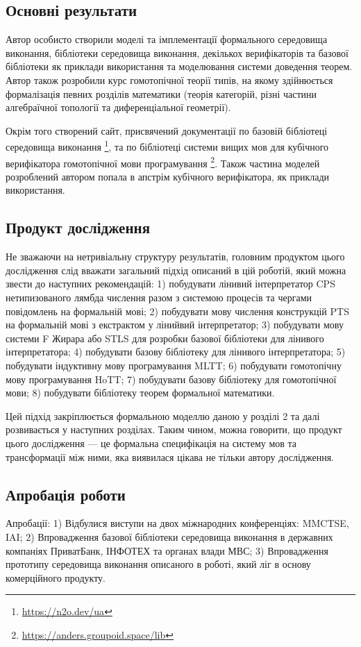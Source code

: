 \subsection{Основні результати}
Автор особисто створили моделі та імплементації формального середовища виконання,
бібліотеки середовища виконання, декількох верифікаторів та базової бібліотеки
як приклади використання та моделювання системи доведення теорем. Автор також
розробили курс гомотопічної теорії типів, на якому здійнюється формалізація
певних розділів математики (теорія категорій, різні частини алгебраїчної
топології та диференціальної геометрії).

Окрім того створений сайт, присвячений документації по базовій бібліотеці
середовища виконання \footnote{\url{https://n2o.dev/ua}},
та по бібліотеці системи вищих мов для кубічного верифікатора гомотопічної
мови програмування \footnote{\url{https://anders.groupoid.space/lib}}. Також частина
моделей розроблений автором попала в апстрім кубічного верифікатора,
як приклади використання.

\subsection{Продукт дослідження}
Не зважаючи на нетривіальну структуру результатів, головним продуктом цього
дослідження слід вважати загальний підхід описаний в цій роботій, який можна
звести до наступних рекомендацій:
1) побудувати лінивий інтерпретатор CPS нетипизованого лямбда числення разом
   з системою процесів та чергами повідомлень на формальній мові;
2) побудувати мову числення конструкцій PTS на формальній мові з екстрактом у лінийвий інтерпретатор;
3) побудувати мову системи F Жирара або STLS для розробки базової бібліотеки для лінивого інтерпретатора;
4) побудувати базову бібліотеку для лінивого інтерпретатора;
5) побудувати індуктивну мову програмування MLTT;
6) побудувати гомотопічну мову програмування HoTT;
7) побудувати базову бібліотеку для гомотопічної мови;
8) побудувати бібліотеку теорем формальної математики.

Цей підхід закріплюється формальною моделлю даною у розділі 2 та далі розвивається у наступних розділах.
Таким чином, можна говорити, що продукт цього дослідження --- це формальна специфікація на систему мов та
трансформації між ними, яка виявилася цікава не тільки автору дослідження.

\subsection{Апробація роботи}
Апробації:
1) Відбулися виступи на двох міжнародних конференціях: MMCTSE, IAI;
2) Впровадження базової бібліотеки середовища виконання в державних компаніях ПриватБанк,
   ІНФОТЕХ та органах влади МВС;
3) Впровадження прототипу середовища виконання описаного в роботі,
   який ліг в основу комерційного продукту.

